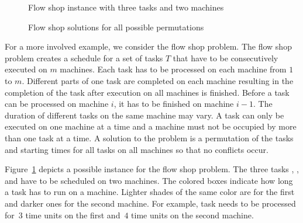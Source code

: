 \begin{example}\label{ex:dl:fs}

\begin{figure}[ht]
\centering
{\def\svgscale{.4}
}
\caption{Flow shop instance with three tasks and two machines\label{fig:fs:ins}}
\end{figure}
\begin{figure}[ht]
\centering
{\def\svgwidth{\linewidth}
}
\caption{Flow shop solutions for all possible permutations\label{fig:fs:sol}}
\end{figure}
%
For a more involved example, we consider the flow shop problem.
The flow shop problem creates a schedule for a set of tasks $T$ that have to be consecutively executed on $m$ machines.
%
Each task has to be processed on each machine from $1$ to $m$. 
Different parts of one task are completed on each machine resulting in the completion of the task after execution on all machines is finished.
Before a task can be processed on machine $i$, it has to be finished on machine $i-1$.
The duration of different tasks on the same machine may vary.
A task can only be executed on one machine at a time and
a machine must not be occupied by more than one task at a time.
%
A solution to the problem is a permutation of the tasks and starting times for all tasks on all machines so that no conflicts occur.

Figure~\ref{fig:fs:ins} depicts a possible instance for the flow shop problem.
The three tasks , , and  have to be scheduled on two machines.
The colored boxes indicate how long a task has to run on a machine.
Lighter shades of the same color are for the first and darker ones for the second machine.
For example, task  needs to be processed for~$3$ time units on the first and~$4$ time units on the second machine.


\end{example}
